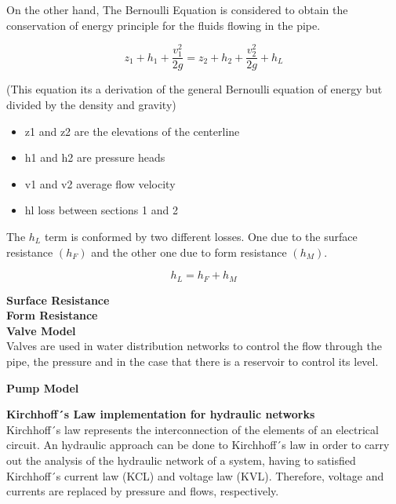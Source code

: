 On the other hand, The Bernoulli Equation is considered to obtain the conservation of energy principle for the fluids flowing in the pipe.

\begin{equation}
  \label{Bernoulliequation}
z_1 + h_1 + \frac{v_1^{2}}{2g} = z_2 + h_2 + \frac{v_2^{2}}{2g} + h_L
\end{equation}

(This equation its a derivation of the general Bernoulli equation of energy but divided by the density and 
gravity)\\

\begin{itemize}
  \item   z1 and z2 are the elevations of the centerline
  \item   h1 and h2 are pressure heads
  \item   v1 and v2 average flow velocity
  \item   hl loss between sections 1 and 2
\end{itemize}

The $h_L$ term is conformed by two different losses. One due to the surface resistance $(h_F)$ and the other one due to form resistance $(h_M)$. 

\begin{equation}
  h_L = h_F + h_M
\end{equation}

\textbf{Surface Resistance} \\ 

\textbf{Form Resistance} \\ 

\textbf{Valve Model}  \\
\label{ValveModel}
 Valves are used in water distribution networks to control the flow through the pipe, the pressure and in 
 the case that there is a reservoir to control its level. 
 
 \textbf{Pump Model} \\
 \label{PumpModel}
 
 \textbf{Kirchhoff´s Law implementation for hydraulic networks}\\
 \label{KirchhoffLaw}
 Kirchhoff´s law represents the interconnection of the elements of an electrical circuit. An hydraulic approach 
 can be done to Kirchhoff´s law in order to carry out the analysis of the hydraulic network of a system, having to satisfied Kirchhoff´s 
 current law (KCL) and voltage law (KVL). Therefore, voltage and currents are replaced by pressure and flows, respectively. 

